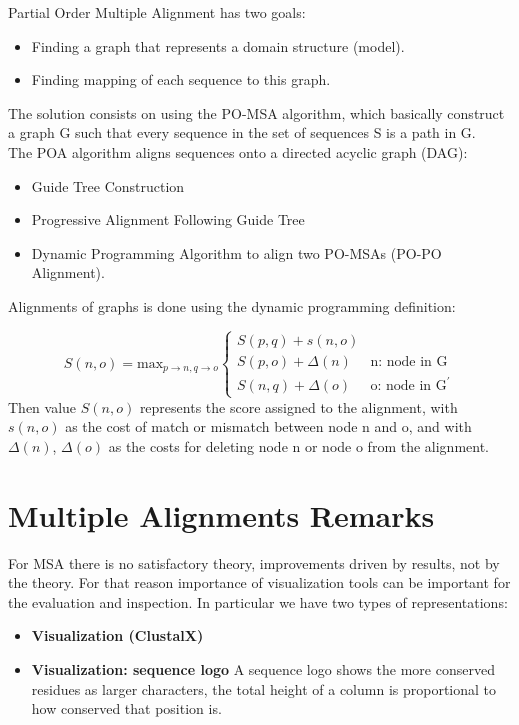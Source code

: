 Partial Order Multiple Alignment has two goals:
\begin{itemize}
	\item Finding a graph that represents a domain structure (model).
	\item Finding mapping of each sequence to this graph.
\end{itemize}
The solution consists on using the PO-MSA algorithm, which basically construct a graph G such that every sequence in the set of sequences S is a path in G. \\
The POA algorithm aligns sequences onto a directed acyclic graph (DAG):
\begin{itemize}
	\item Guide Tree Construction
	\item Progressive Alignment Following Guide Tree
	\item Dynamic Programming Algorithm to align two PO-MSAs (PO-PO Alignment).
\end{itemize}
Alignments of graphs is done using the dynamic programming definition:

$$S(n,o) = \text{max}_{p\rightarrow n, q \rightarrow o} \begin{cases}
S(p,q) + s(n,o) & \\
S(p,o) + \Delta(n) & \text{n: node in G}\\
S(n,q) + \Delta(o) & \text{o: node in G}^\prime
\end{cases}$$
Then value $S(n,o)$ represents the score assigned to the alignment, with $s(n,o)$ as the cost of match or mismatch between node n and o, and with $\Delta(n)$, $\Delta(o)$ as the costs for deleting node n or node o from the alignment.

\section{Multiple Alignments Remarks}
For MSA there is no satisfactory theory, improvements driven by results, not by the theory. For that reason importance of visualization tools can be important for the evaluation and inspection. In particular we have two types of representations:
\begin{itemize}
	\item \textbf{Visualization (ClustalX)} 
	
	\item \textbf{Visualization: sequence logo}
	 A sequence logo shows the more conserved residues as larger characters, the total height of a column is proportional to how conserved that position is.

\end{itemize}
